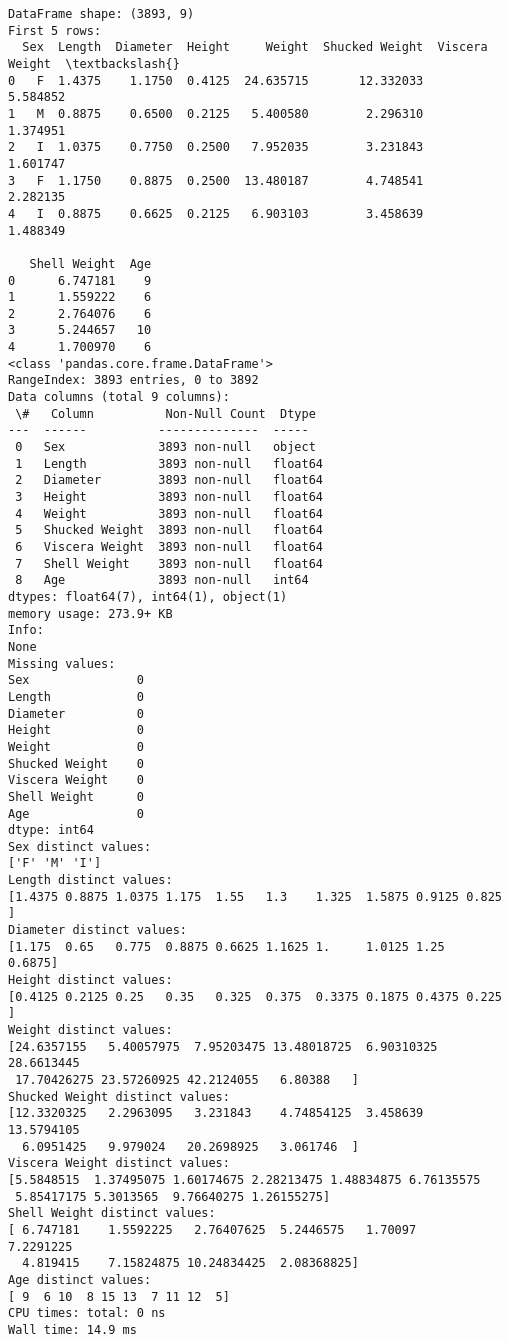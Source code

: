 \documentclass[11pt]{article}
\begin{document}
    \begin{Verbatim}[commandchars=\\\{\}]
DataFrame shape: (3893, 9)
First 5 rows:
  Sex  Length  Diameter  Height     Weight  Shucked Weight  Viscera Weight  \textbackslash{}
0   F  1.4375    1.1750  0.4125  24.635715       12.332033        5.584852
1   M  0.8875    0.6500  0.2125   5.400580        2.296310        1.374951
2   I  1.0375    0.7750  0.2500   7.952035        3.231843        1.601747
3   F  1.1750    0.8875  0.2500  13.480187        4.748541        2.282135
4   I  0.8875    0.6625  0.2125   6.903103        3.458639        1.488349

   Shell Weight  Age
0      6.747181    9
1      1.559222    6
2      2.764076    6
3      5.244657   10
4      1.700970    6
<class 'pandas.core.frame.DataFrame'>
RangeIndex: 3893 entries, 0 to 3892
Data columns (total 9 columns):
 \#   Column          Non-Null Count  Dtype
---  ------          --------------  -----
 0   Sex             3893 non-null   object
 1   Length          3893 non-null   float64
 2   Diameter        3893 non-null   float64
 3   Height          3893 non-null   float64
 4   Weight          3893 non-null   float64
 5   Shucked Weight  3893 non-null   float64
 6   Viscera Weight  3893 non-null   float64
 7   Shell Weight    3893 non-null   float64
 8   Age             3893 non-null   int64
dtypes: float64(7), int64(1), object(1)
memory usage: 273.9+ KB
Info:
None
Missing values:
Sex               0
Length            0
Diameter          0
Height            0
Weight            0
Shucked Weight    0
Viscera Weight    0
Shell Weight      0
Age               0
dtype: int64
Sex distinct values:
['F' 'M' 'I']
Length distinct values:
[1.4375 0.8875 1.0375 1.175  1.55   1.3    1.325  1.5875 0.9125 0.825 ]
Diameter distinct values:
[1.175  0.65   0.775  0.8875 0.6625 1.1625 1.     1.0125 1.25   0.6875]
Height distinct values:
[0.4125 0.2125 0.25   0.35   0.325  0.375  0.3375 0.1875 0.4375 0.225 ]
Weight distinct values:
[24.6357155   5.40057975  7.95203475 13.48018725  6.90310325 28.6613445
 17.70426275 23.57260925 42.2124055   6.80388   ]
Shucked Weight distinct values:
[12.3320325   2.2963095   3.231843    4.74854125  3.458639   13.5794105
  6.0951425   9.979024   20.2698925   3.061746  ]
Viscera Weight distinct values:
[5.5848515  1.37495075 1.60174675 2.28213475 1.48834875 6.76135575
 5.85417175 5.3013565  9.76640275 1.26155275]
Shell Weight distinct values:
[ 6.747181    1.5592225   2.76407625  5.2446575   1.70097     7.2291225
  4.819415    7.15824875 10.24834425  2.08368825]
Age distinct values:
[ 9  6 10  8 15 13  7 11 12  5]
CPU times: total: 0 ns
Wall time: 14.9 ms
    \end{Verbatim}
\end{document}
